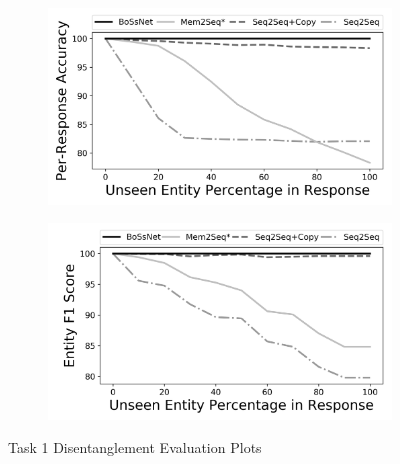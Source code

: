\begin{figure}[!t]
\centering
\begin{subfigure}{0.8\textwidth}
 \includegraphics[width=\linewidth]{assets/graphs/task1_Acc.png}
 \caption{}\label{fig:t1Acc}
\end{subfigure}

\vspace*{0.5in}

\begin{subfigure}{0.8\textwidth}
 \includegraphics[width=\linewidth]{assets/graphs/task1_F1.png}
 \caption{}\label{fig:t1F1}
\end{subfigure}

\caption{Task 1 Disentanglement Evaluation Plots}
\vspace*{0.5in}

\end{figure}

\clearpage



